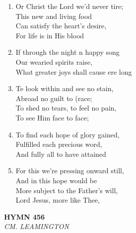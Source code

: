 \documentclass[11pt,a4paper]{article}
\begin{document}
\begin{enumerate}
    \item Or Christ the Lord we'd never tire; \\
        This new and living food \\
        Can satisfy the heart's desire, \\
        For life is in His blood

    \item If through the night n happy song \\
        Our wearied spirits raise, \\
        What greater joys shall cause ere long

    \item Te look within and see no stain, \\
        Abroad no guilt to (race; \\
        To shed no tears, to feel no pain, \\
        To see Him face to face;

    \item To find each hope of glory gained, \\
        Fulfilled each precious word, \\
        And fully all to have attained

    \item For this we're pressing onward still, \\
        And in this hope would be \\
        More subject to the Father's will, \\
        Lord Jesus, more like Thee,

\end{enumerate}

\newpage
\begin{center}
    {\Large \textbf{HYMN 456}}
    \\
    \textit{CM. LEAMINGTON}
\end{center}
\vspace{1em}
\end{document}
